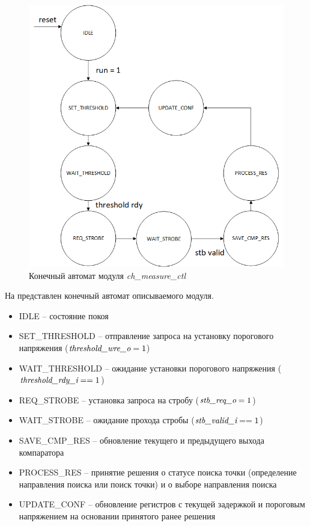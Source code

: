 \begin{figure}[ht!] 
	\center
	\includegraphics  [scale=0.7] {my_folder/images//ch_ctl}
	\caption{Конечный автомат модуля \emph{ch\_measure\_ctl}} 
	\label{fig:ch-ctl-fsm}  
\end{figure}

\FloatBarrier

На  представлен конечный автомат описываемого модуля.

\noindent
\begin{itemize}[label={}]
	\item IDLE -- состояние покоя 
	\item SET\_THRESHOLD -- отправление запроса на установку порогового напряжения ($ \emph{threshold\_wre\_o} = 1 $)
	\item WAIT\_THRESHOLD -- ожидание установки порогового напряжения ($ \emph{threshold\_rdy\_i} == 1 $)
	\item REQ\_STROBE -- установка запроса на стробу ($ \emph{stb\_req\_o} = 1 $)
	\item WAIT\_STROBE -- ожидание прохода стробы ($ \emph{stb\_valid\_i} == 1 $)
	\item SAVE\_CMP\_RES -- обновление текущего и предыдущего выхода компаратора
	\item PROCESS\_RES -- принятие решения о статусе поиска точки (определение направления поиска или поиск точки)
					и о выборе направления поиска
	\item UPDATE\_CONF -- обновление регистров с текущей задержкой и пороговым напряжением на основании принятого ранее решения\\
\end{itemize}

